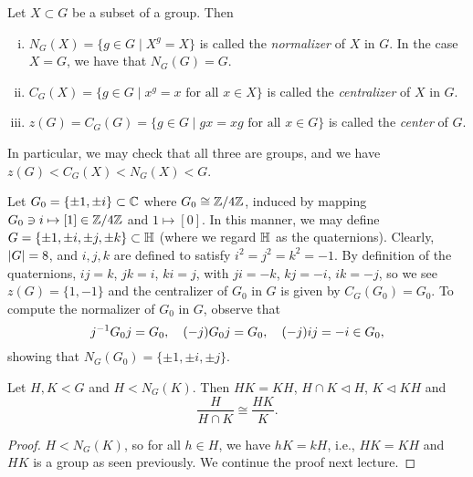 \begin{definition}
    Let $X \subset G$ be a subset of a group. Then
    \begin{enumerate}[(i)]
        \item $N_G(X) = \{g \in G \mid X^g = X\}$ is called the \textit{normalizer} of $X$ in $G$. In the case $X = G$, we have that $N_G(G) = G$.
        \item $C_G(X) = \{g \in G \mid x^g = x \text{ for all } x \in X\}$ is called the \textit{centralizer} of $X$ in $G$.
        \item $z(G) = C_G(G) = \{g \in G \mid gx = xg \text{ for all } x \in G\}$ is called the \textit{center} of $G$.
    \end{enumerate}
    In particular, we may check that all three are groups, and we have $z(G) < C_G(X) < N_G(X) < G$.
\end{definition}
\begin{example}
    Let $G_0 = \{\pm 1, \pm i\} \subset \mathbb C$ where $G_0 \cong \mathbb Z/4\mathbb Z$, induced by mapping $G_0 \ni i \mapsto [1] \in \mathbb Z/4\mathbb Z$ and $1 \mapsto [0]$. In this manner, we may define $G = \{\pm 1, \pm i, \pm j, \pm k\} \subset \mathbb H$ (where we regard $\mathbb H$ as the quaternions). Clearly, $\left\lvert G \right\rvert = 8$, and $i, j, k$ are defined to satisfy $i^2 = j^2 = k^2 = -1$. By definition of the quaternions, $ij = k$, $jk = i$, $ki = j$, with $ji = -k$, $kj = -i$, $ik = -j$, so we see $z(G) = \{1, -1\}$ and the centralizer of $G_0$ in $G$ is given by $C_G(G_0) = G_0$. To compute the normalizer of $G_0$ in $G$, observe that
    \[ j ^{-1} G_0 j = G_0, \quad (-j) G_0 j  = G_0, \quad (-j) i j = -i \in G_0, \]
    showing that $N_G(G_0) = \{\pm 1, \pm i, \pm j\}$.
\end{example}
\begin{theorem}
    Let $H, K < G$ and $H < N_G(K)$. Then $HK = KH$, $H \cap K \lhd H$, $K \lhd KH$ and
    \[ \frac{H}{H \cap K} \cong \frac{HK}{K}. \]
\end{theorem}
\begin{proof}
    $H < N_G(K)$, so for all $h \in H$, we have $hK = kH$, i.e., $HK = KH$ and $HK$ is a group as seen previously. We continue the proof next lecture.
\end{proof}